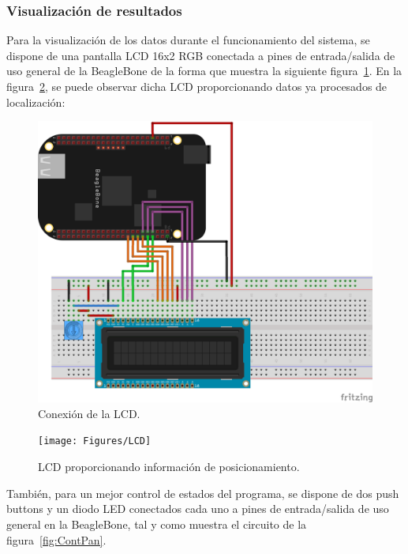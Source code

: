 \subsubsection{Visualización de resultados}

Para la visualización de los datos durante el funcionamiento del sistema, se dispone de una pantalla LCD 16x2 RGB conectada a pines de entrada/salida de uso general de la BeagleBone de la forma que muestra la siguiente figura~\ref{fig:LCDCon}. En la figura~\ref{fig:LCDFunc}, se puede observar dicha LCD proporcionando datos ya procesados de localización:

\begin{figure}[H]
\centering
\includegraphics[scale=0.75]{Figures/LCD_Con}
\caption[Conexión de la LCD.]{Conexión de la LCD.}
\label{fig:LCDCon}
\end{figure} 

\begin{figure}[H]
\centering
\texttt{[image: Figures/LCD]}
\caption[LCD proporcionando información de posicionamiento.]{LCD proporcionando información de posicionamiento.}
\label{fig:LCDFunc}
\end{figure}

También, para un mejor control de estados del programa, se dispone de dos push buttons y un diodo LED conectados cada uno a pines de entrada/salida de uso general en la BeagleBone, tal y como muestra el circuito de la figura~\ref{fig:ContPan}.

